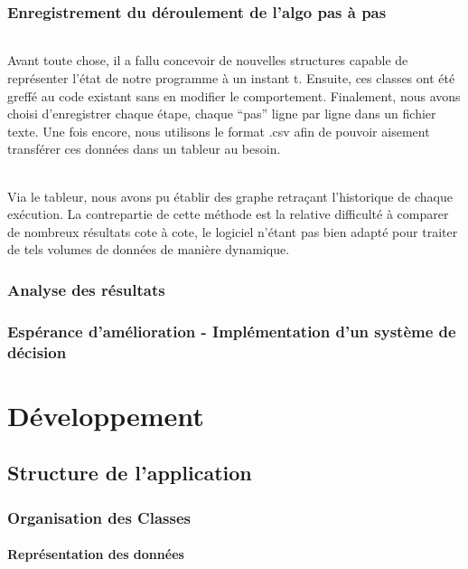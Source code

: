 \documentclass[a4paper,10pt]{report}
\begin{document}
\section{Enregistrement du déroulement de l'algo pas à pas}

\paragraph{}
  Avant toute chose, il a fallu concevoir de nouvelles structures capable de représenter l'état de notre programme
à un instant t. Ensuite, ces classes ont été greffé au code existant sans en modifier le comportement. Finalement,
nous avons choisi d'enregistrer chaque étape, chaque ``pas'' ligne par ligne dans un fichier texte. Une fois encore,
nous utilisons le format .csv afin de pouvoir aisement transférer ces données dans un tableur au besoin.

\paragraph{}
  Via le tableur, nous avons pu établir des graphe retraçant l'historique de chaque exécution. La contrepartie de
cette méthode est la relative difficulté à comparer de nombreux résultats cote à cote, le logiciel n'étant pas
bien adapté pour traiter de tels volumes de données de manière dynamique.

\section{Analyse des résultats}

\section{Espérance d'amélioration - Implémentation d'un système de décision}

\part{Développement}
\chapter{Structure de l'application}
\section{Organisation des Classes}
\subsection{Représentation des données}
\end{document}
